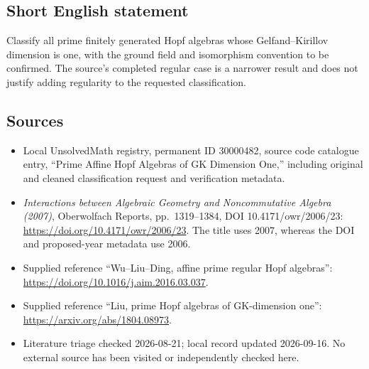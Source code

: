 \documentclass[11pt]{article}
\begin{document}
\subsection{Short English statement}
Classify all prime finitely generated Hopf algebras whose Gelfand--Kirillov dimension is one, with the ground field and isomorphism convention to be confirmed. The source's completed regular case is a narrower result and does not justify adding regularity to the requested classification.
\subsection{Sources}
\begin{itemize}
\item Local UnsolvedMath registry, permanent ID 30000482, source code catalogue entry, ``Prime Affine Hopf Algebras of GK Dimension One,'' including original and cleaned classification request and verification metadata.
\item \emph{Interactions between Algebraic Geometry and Noncommutative Algebra (2007)}, Oberwolfach Reports, pp.\ 1319--1384, DOI 10.4171/owr/2006/23: \url{https://doi.org/10.4171/owr/2006/23}. The title uses 2007, whereas the DOI and proposed-year metadata use 2006.
\item Supplied reference ``Wu--Liu--Ding, affine prime regular Hopf algebras'': \url{https://doi.org/10.1016/j.aim.2016.03.037}.
\item Supplied reference ``Liu, prime Hopf algebras of GK-dimension one'': \url{https://arxiv.org/abs/1804.08973}.
\item Literature triage checked 2026-08-21; local record updated 2026-09-16. No external source has been visited or independently checked here.
\end{itemize}
\end{document}
